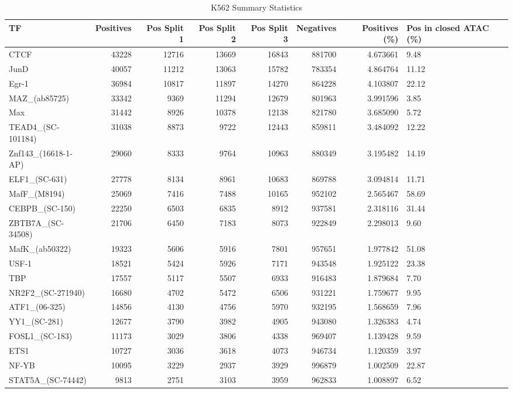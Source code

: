 \begin{table}
\caption{K562 Summary Statistics}
\label{tab:k562}
\begin{tabular}{lrrrrrrl}
\toprule
TF & Positives & Pos Split 1 & Pos Split 2 & Pos Split 3 & Negatives & Positives (\%) & Pos in closed ATAC (\%) \\
\midrule
CTCF & 43228 & 12716 & 13669 & 16843 & 881700 & 4.673661 & 9.48 \\
JunD & 40057 & 11212 & 13063 & 15782 & 783354 & 4.864764 & 11.12 \\
Egr-1 & 36984 & 10817 & 11897 & 14270 & 864228 & 4.103807 & 22.12 \\
MAZ\_(ab85725) & 33342 & 9369 & 11294 & 12679 & 801963 & 3.991596 & 3.85 \\
Max & 31442 & 8926 & 10378 & 12138 & 821780 & 3.685090 & 5.72 \\
TEAD4\_(SC-101184) & 31038 & 8873 & 9722 & 12443 & 859811 & 3.484092 & 12.22 \\
Znf143\_(16618-1-AP) & 29060 & 8333 & 9764 & 10963 & 880349 & 3.195482 & 14.19 \\
ELF1\_(SC-631) & 27778 & 8134 & 8961 & 10683 & 869788 & 3.094814 & 11.71 \\
MafF\_(M8194) & 25069 & 7416 & 7488 & 10165 & 952102 & 2.565467 & 58.69 \\
CEBPB\_(SC-150) & 22250 & 6503 & 6835 & 8912 & 937581 & 2.318116 & 31.44 \\
ZBTB7A\_(SC-34508) & 21706 & 6450 & 7183 & 8073 & 922849 & 2.298013 & 9.60 \\
MafK\_(ab50322) & 19323 & 5606 & 5916 & 7801 & 957651 & 1.977842 & 51.08 \\
USF-1 & 18521 & 5424 & 5926 & 7171 & 943548 & 1.925122 & 23.38 \\
TBP & 17557 & 5117 & 5507 & 6933 & 916483 & 1.879684 & 7.70 \\
NR2F2\_(SC-271940) & 16680 & 4702 & 5472 & 6506 & 931221 & 1.759677 & 9.95 \\
ATF1\_(06-325) & 14856 & 4130 & 4756 & 5970 & 932195 & 1.568659 & 7.96 \\
YY1\_(SC-281) & 12677 & 3790 & 3982 & 4905 & 943080 & 1.326383 & 4.74 \\
FOSL1\_(SC-183) & 11173 & 3029 & 3806 & 4338 & 969407 & 1.139428 & 9.59 \\
ETS1 & 10727 & 3036 & 3618 & 4073 & 946734 & 1.120359 & 3.97 \\
NF-YB & 10095 & 3229 & 2937 & 3929 & 996879 & 1.002509 & 22.87 \\
STAT5A\_(SC-74442) & 9813 & 2751 & 3103 & 3959 & 962833 & 1.008897 & 6.52 \\

\end{tabular}
\end{table}
